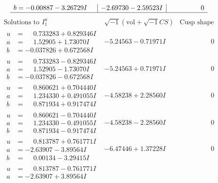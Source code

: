 \documentclass[1p]{elsarticle_modified}
\theoremstyle{definition}
\newcommand{\I}{\sqrt{-1}}
\begin{document}
$$\begin{array}{c|c|c}
\begin{aligned}
b &= -0.00887 - 3.26729 I\end{aligned}
 & -2.69730 - 2.59523 I & \phantom{-0.000000 } 0\\
 \hline 
 \end{array}$$\newpage$$\begin{array}{c|c|c}  
\text{Solutions to }I^u_{1}& \I (\text{vol} + \sqrt{-1}CS) & \text{Cusp shape}\\
 \hline 
\begin{aligned}
u &= \phantom{-}0.733283 + 0.829346 I \\
a &= \phantom{-}1.52905 + 1.73070 I \\
b &= -0.037826 + 0.672568 I\end{aligned}
 & -5.24563 - 0.71971 I & \phantom{-0.000000 } 0 \\ \hline\begin{aligned}
u &= \phantom{-}0.733283 - 0.829346 I \\
a &= \phantom{-}1.52905 - 1.73070 I \\
b &= -0.037826 - 0.672568 I\end{aligned}
 & -5.24563 + 0.71971 I & \phantom{-0.000000 } 0 \\ \hline\begin{aligned}
u &= \phantom{-}0.860621 + 0.704440 I \\
a &= \phantom{-}1.234330 + 0.491055 I \\
b &= \phantom{-}0.871934 + 0.917474 I\end{aligned}
 & -4.58238 + 2.28560 I & \phantom{-0.000000 } 0 \\ \hline\begin{aligned}
u &= \phantom{-}0.860621 - 0.704440 I \\
a &= \phantom{-}1.234330 - 0.491055 I \\
b &= \phantom{-}0.871934 - 0.917474 I\end{aligned}
 & -4.58238 - 2.28560 I & \phantom{-0.000000 } 0 \\ \hline\begin{aligned}
u &= \phantom{-}0.813787 + 0.761771 I \\
a &= -2.63907 - 3.89564 I \\
b &= \phantom{-}0.00134 - 3.29415 I\end{aligned}
 & -6.47446 + 1.37228 I & \phantom{-0.000000 } 0 \\ \hline\begin{aligned}
u &= \phantom{-}0.813787 - 0.761771 I \\
a &= -2.63907 + 3.89564 I \\

\end{aligned}
\end{array}$$
\end{document}
